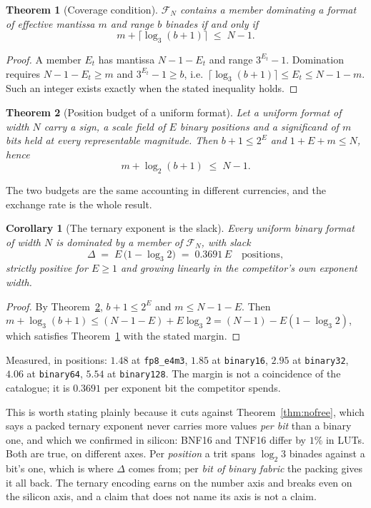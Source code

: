 \documentclass[11pt]{article}
\newtheorem{theorem}{Theorem}
\newtheorem{corollary}{Corollary}
\theoremstyle{definition}
\begin{document}
\begin{theorem}[Coverage condition]
\label{thm:coverage}
$\mathcal{F}_N$ contains a member dominating a format of effective mantissa $m$
and range $b$ binades if and only if
\[
  m + \lceil \log_3 (b+1) \rceil \;\le\; N-1 .
\]
\end{theorem}
\begin{proof}
A member $E_t$ has mantissa $N-1-E_t$ and range $3^{E_t}-1$. Domination requires
$N-1-E_t \ge m$ and $3^{E_t}-1 \ge b$, i.e.\ $\lceil\log_3(b+1)\rceil \le E_t \le
N-1-m$. Such an integer exists exactly when the stated inequality holds.
\end{proof}

\begin{theorem}[Position budget of a uniform format]
\label{thm:budget}
Let a \emph{uniform} format of width $N$ carry a sign, a scale field of $E$ binary
positions and a significand of $m$ bits held at every representable magnitude.
Then $b+1 \le 2^{E}$ and $1+E+m \le N$, hence
\[
  m + \log_2(b+1) \;\le\; N-1 .
\]
\end{theorem}

The two budgets are the same accounting in different currencies, and the exchange
rate is the whole result.

\begin{corollary}[The ternary exponent is the slack]
\label{cor:slack}
Every uniform binary format of width $N$ is dominated by a member of
$\mathcal{F}_N$, with slack
\[
  \Delta \;=\; E\,\bigl(1 - \log_3 2\bigr) \;=\; 0.3691\,E \quad\text{positions},
\]
strictly positive for $E \ge 1$ and growing linearly in the competitor's own
exponent width.
\end{corollary}
\begin{proof}
By Theorem~\ref{thm:budget}, $b+1 \le 2^E$ and $m \le N-1-E$. Then
$m + \log_3(b+1) \le (N-1-E) + E\log_3 2 = (N-1) - E(1-\log_3 2)$, which satisfies
Theorem~\ref{thm:coverage} with the stated margin.
\end{proof}

Measured, in positions: $1.48$ at \texttt{fp8\_e4m3}, $1.85$ at
\texttt{binary16}, $2.95$ at \texttt{binary32}, $4.06$ at \texttt{binary64},
$5.54$ at \texttt{binary128}. The margin is not a coincidence of the catalogue; it
is $0.3691$ per exponent bit the competitor spends.

This is worth stating plainly because it cuts against
Theorem~\ref{thm:nofree}, which says a packed ternary exponent never carries
more values \emph{per bit} than a binary one, and which we confirmed in silicon:
BNF16 and TNF16 differ by $1\%$ in LUTs. Both are true, on different axes. Per
\emph{position} a trit spans $\log_2 3$ binades against a bit's one, which is
where $\Delta$ comes from; per \emph{bit of binary fabric} the packing gives it
all back. The ternary encoding earns on the number axis and breaks even on the
silicon axis, and a claim that does not name its axis is not a claim.
\end{document}

